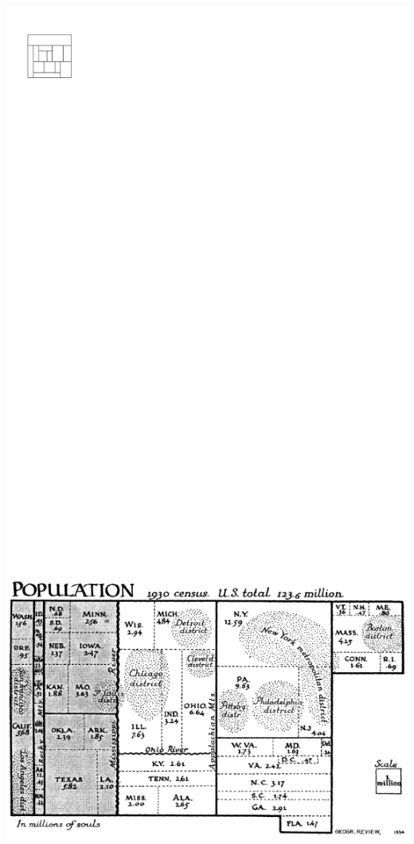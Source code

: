 \documentclass[a4paper]{article}
\begin{document}
\includegraphics[scale=1]{rectangularDuals/img/vertonesided}
\clearpage%
\includegraphics[scale=.5]{./introduction/img/cartogram.png}
\end{document}

